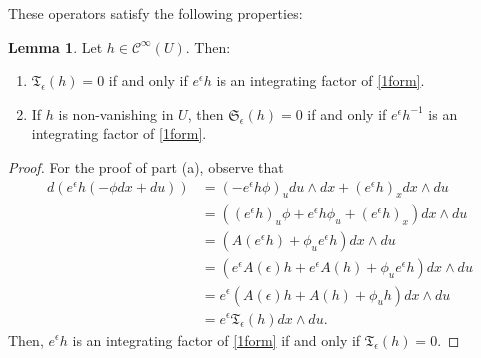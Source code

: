 \documentclass{article}
\theoremstyle{remark}
\theoremstyle{definition}
\newtheorem{lemma}[remark]{Lemma}
\begin{document}
These operators satisfy the following properties:
\begin{lemma}\label{prop:intsymop}
Let $h\in \mathcal{C}^{\infty}(U)$. Then:
\begin{enumerate}[label=(\alph*)]
    \item \label{it:integrating} $\mathfrak{T}_{\epsilon}(h)=0$ if and only if $e^{\epsilon} h$ is an integrating factor of \eqref{1form}.
    \item If $h$ is non-vanishing in $U$, then $\mathfrak{S}_{\epsilon}(h)=0$ if and only if $e^{\epsilon} h^{-1}$ is an integrating factor of \eqref{1form}.
\end{enumerate} 
\end{lemma}
\begin{proof}
For the proof of part (a), observe that
\begin{equation}
    \begin{aligned}
        d\left(e^{\epsilon} h (-\phi dx+du)\right)
        &= (- e^{\epsilon} h \phi)_u du\wedge dx+(e^{\epsilon} h)_x dx\wedge du \\
        &= \left((e^{\epsilon} h)_u \phi+e^{\epsilon} h\phi_u+(e^{\epsilon} h)_x\right) dx\wedge du \\
        &= \left(A(e^{\epsilon} h) + \phi_u e^{\epsilon} h\right) dx \wedge du \\
        &= \left(e^{\epsilon} A(\epsilon)h + e^{\epsilon} A(h) + \phi_u e^{\epsilon}h\right)dx \wedge du \\
        &= e^{\epsilon} \left(A(\epsilon)h + A(h) + \phi_u h\right)dx \wedge du \\
        &= e^{\epsilon} \mathfrak{T}_{\epsilon}(h)dx \wedge du.
    \end{aligned}
\end{equation}
Then, $e^{\epsilon} h$ is an integrating factor of \eqref{1form} if and only if $\mathfrak{T}_{\epsilon}(h)=0$.


\end{proof}
\end{document}
